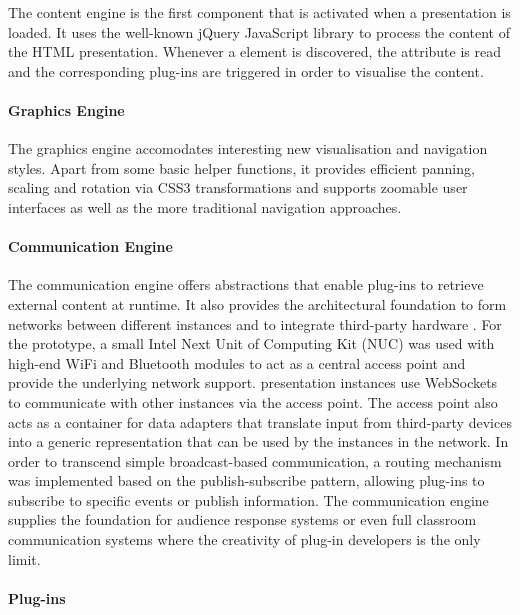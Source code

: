       The content engine is the first component that is activated when a
      presentation is loaded. It uses the well-known jQuery JavaScript library
      to process the content of the HTML presentation. Whenever a 
      element is discovered, the  attribute is read and the
      corresponding plug-ins are triggered in order to visualise the content.

     \paragraph{Graphics Engine}
     
      The graphics engine accomodates interesting new visualisation and
      navigation styles. Apart from some basic helper functions, it provides
      efficient panning, scaling and rotation via CSS3 transformations and
      supports zoomable user interfaces as well as the more traditional
      navigation approaches.

     \paragraph{Communication Engine}
     
      The communication engine offers abstractions that enable plug-ins to
      retrieve external content at runtime. It also provides the architectural
      foundation to form networks between different \mxp instances and to
      integrate third-party hardware \citep{roels-2}. For the \mxp prototype, a
      small Intel Next Unit of Computing Kit (NUC) was used with high-end WiFi
      and Bluetooth modules to act as a central access point and provide the
      underlying network support. \mxp presentation instances use WebSockets to
      communicate with other \mxp instances via the access point. The access
      point also acts as a container for data adapters that translate input
      from third-party devices into a generic representation that can be used
      by the \mxp instances in the network. In order to transcend simple
      broadcast-based communication, a routing mechanism was implemented based
      on the publish-subscribe pattern, allowing plug-ins to subscribe to
      specific events or publish information. The communication engine supplies
      the foundation for audience response systems \citep{roels-2} or even full
      classroom communication systems where the creativity of plug-in
      developers is the only limit.

     \paragraph{Plug-ins}
     
